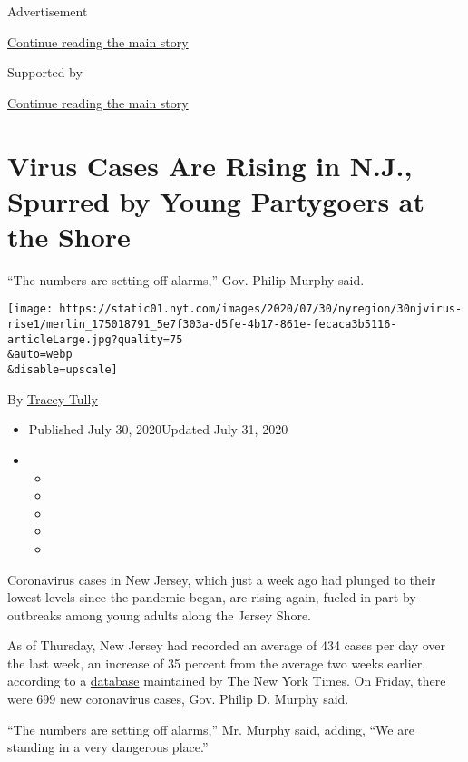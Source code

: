 Advertisement

\protect\hyperlink{after-top}{Continue reading the main story}

Supported by

\protect\hyperlink{after-sponsor}{Continue reading the main story}

\hypertarget{virus-cases-are-rising-in-nj-spurred-by-young-partygoers-at-the-shore}{%
\section{Virus Cases Are Rising in N.J., Spurred by Young Partygoers at
the
Shore}\label{virus-cases-are-rising-in-nj-spurred-by-young-partygoers-at-the-shore}}

``The numbers are setting off alarms,'' Gov. Philip Murphy said.

\texttt{[image: https://static01.nyt.com/images/2020/07/30/nyregion/30njvirus-rise1/merlin\_175018791\_5e7f303a-d5fe-4b17-861e-fecaca3b5116-articleLarge.jpg?quality=75\\\&auto=webp\\\&disable=upscale]}

By \href{https://www.nytimes.com/by/tracey-tully}{Tracey Tully}

\begin{itemize}
\item
  Published July 30, 2020Updated July 31, 2020
\item
  \begin{itemize}
  \item
  \item
  \item
  \item
  \item
  \end{itemize}
\end{itemize}

Coronavirus cases in New Jersey, which just a week ago had plunged to
their lowest levels since the pandemic began, are rising again, fueled
in part by outbreaks among young adults along the Jersey Shore.

As of Thursday, New Jersey had recorded an average of 434 cases per day
over the last week, an increase of 35 percent from the average two weeks
earlier, according to a
\href{https://www.nytimes.com/interactive/2020/us/new-jersey-coronavirus-cases.html}{database}
maintained by The New York Times. On Friday, there were 699 new
coronavirus cases, Gov. Philip D. Murphy said.

``The numbers are setting off alarms,'' Mr. Murphy said, adding, ``We
are standing in a very dangerous place.''

